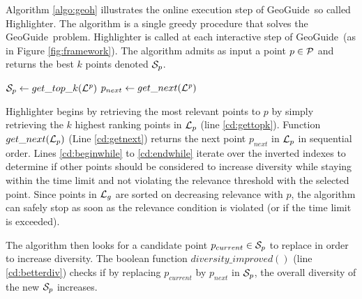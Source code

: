 \documentclass[conference,compsoc]{IEEEtran}
\newcommand{\framework}{{\sc GeoGuide}}
\newcommand{\pb}{{\sc GeoGuide}}
\begin{document}

Algorithm \ref{algo:geoh} illustrates the online execution step of \framework\, so called {\sc Highlighter}. The algorithm is a single greedy procedure that solves the \pb\ problem. {\sc Highlighter} is called at each interactive step of \framework\ (as in Figure \ref{fig:framework}). The algorithm admits as input a point $p \in {\cal P}$ and returns the best $k$ points denoted ${\cal S}_p$.


\begin{algorithm}[t]
	\DontPrintSemicolon
	${\cal S}_p \gets get\_top\_k(\mathit{{\cal L}^p})$\;\label{cd:gettopk}
	$p_{next} \gets get\_next(\mathit{{\cal L}^p})$\;\label{cd:getnext}
	\label{cd:endwhile}
	\; 
	\caption{{\sc Highlighter} Algorithm}
	\label{algo:geoh}
\end{algorithm}

{\sc Highlighter} begins by retrieving the most relevant points to $p$ by simply retrieving the $k$ highest ranking points in ${\cal L}_p$ (line \ref{cd:gettopk}). Function $get\_next({\cal L}_p)$ (Line \ref{cd:getnext}) returns the next point $p_{next}$ in ${\cal L}_p$ in sequential order. Lines \ref{cd:beginwhile} to \ref{cd:endwhile} iterate over the inverted indexes to determine if other points should be considered to increase diversity while staying within the time limit and not violating the relevance threshold with the selected point. Since points in ${\cal L}_g$ are sorted on decreasing relevance with $p$, the algorithm can safely stop as soon as the relevance condition is violated (or if the time limit is exceeded).

The algorithm then looks for a candidate point $p_{current} \in {\cal S}_p$ to replace in order to increase diversity. The boolean function $\mathit{diversity\_improved}()$ (line \ref{cd:betterdiv}) checks if by replacing $p_{current}$ by $p_{next}$ in ${\cal S}_p$, the overall diversity of the new ${\cal S}_p$ increases.
\end{document}
